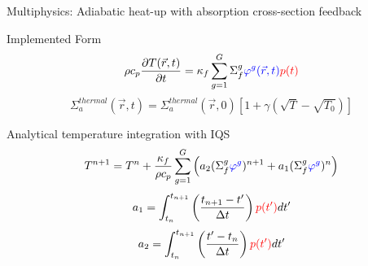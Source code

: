 \documentclass[8pt,xcolor=dvipnames]{beamer}
\newcommand{\be}{\begin{equation*}}
\newcommand{\ee}{\end{equation*}}
\newcommand{\tcr}[1]{\textcolor{red}{#1}}
\newcommand{\tcb}[1]{\textcolor{blue}{#1}}
\begin{document}
\begin{frame}{Multiphysics: Adiabatic heat-up with absorption cross-section feedback}

\begin{block}{Implemented Form}
\be
\rho c_p \frac{\partial T(\vec{r},t)}{\partial t} = \kappa_f \sum^G_{g=1}\Sigma_f^g \tcb{\varphi^g(\vec{r},t)}\tcr{p(t)}
\ee
\be
\Sigma_a^{thermal}(\vec{r},t) = \Sigma_a^{thermal}(\vec{r},0)\left[1+\gamma\left(\sqrt{T}-\sqrt{T_0}\right)\right]
\ee
\end{block}

\begin{block}{Analytical temperature integration with IQS}
\be
T^{n+1} = T^n + \frac{\kappa_f}{\rho c_p} \sum_{g=1}^G\left(a_2(\Sigma_f^g\tcb{\varphi^g})^{n+1} + a_1(\Sigma_f^g\tcb{\varphi^g})^n\right)
\label{eq:temp_an}
\ee
\be
a_1 = \int_{t_n}^{t_{n+1}}\left(\frac{t_{n+1}-t'}{\Delta t}\right)\tcr{p(t')}dt'
\label{eq:a1}
\ee
\be
a_2 = \int_{t_n}^{t_{n+1}}\left(\frac{t'-t_n}{\Delta t}\right)\tcr{p(t')}dt'
\label{eq:a2}
\ee
\end{block}

\end{frame}
\end{document}
